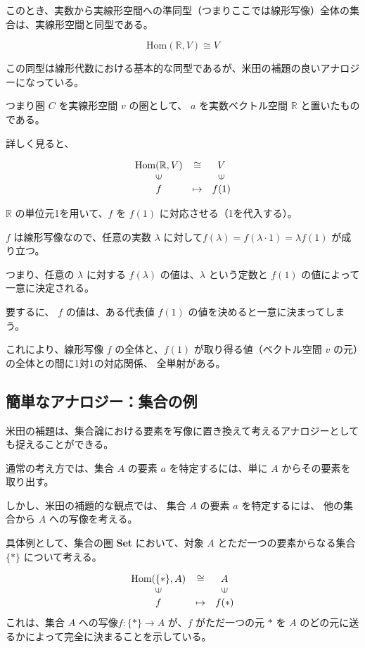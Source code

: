 \documentclass[uplatex,a4j,12pt,dvipdfmx]{jsarticle}
\begin{document}
このとき、実数から実線形空間への準同型（つまりここでは線形写像）全体の集合は、実線形空間と同型である。

\[
	\text{Hom}(\mathbb{R},V) \cong V
\]

この同型は線形代数における基本的な同型であるが、米田の補題の良いアナロジーになっている。

つまり圏 $C$ を実線形空間 $v$ の圏として、
$a$ を実数ベクトル空間 $\mathbb{R}$ と置いたものである。


詳しく見ると、

\[
	\begin{array}{ccc}
		\text{Hom}(\mathbb{R},V) & \cong   & V                       \\
		\rotatebox{90}{${\in}$}  &         & \rotatebox{90}{${\in}$} \\
		f                        & \mapsto & f(1)
	\end{array}
\]

$\mathbb{R}$ の単位元1を用いて、$f$ を $f(1)$ に対応させる（1を代入する）。

$f$ は線形写像なので、任意の実数 $\lambda$ に対して$f(\lambda) = f(\lambda \cdot 1) = \lambda f(1)$ が成り立つ。

つまり、任意の $\lambda$ に対する $f(\lambda)$ の値は、$\lambda$ という定数と $f(1)$ の値によって一意に決定される。

要するに、 $f$ の値は、ある代表値 $f(1)$ の値を決めると一意に決まってしまう。

これにより、線形写像 $f$ の全体と、$f(1)$ が取り得る値（ベクトル空間 $v$ の元）の全体との間に1対1の対応関係、
全単射がある。





\subsection{簡単なアナロジー：集合の例}

米田の補題は、集合論における要素を写像に置き換えて考えるアナロジーとしても捉えることができる。

通常の考え方では、集合 $A$ の要素 $a$ を特定するには、単に $A$ からその要素を取り出す。

しかし、米田の補題的な観点では、
集合 $A$ の要素 $a$ を特定するには、
他の集合から $A$ への写像を考える。


具体例として、集合の圏 \textbf{Set} において、対象 $A$ とただ一つの要素からなる集合 $\{*\}$ について考える。

\[
	\begin{array}{ccc} \text{Hom}(\{*\}, A)& \cong & A \\ \rotatebox{90}{${\in}$} && \rotatebox{90}{${\in}$} \\ f& \mapsto & f(*) \end{array}
\]
これは、集合 $A$ への写像$f: \{*\} \to A$ が、$f$ がただ一つの元 $*$ を $A$ のどの元に送るかによって完全に決まることを示している。
\end{document}
